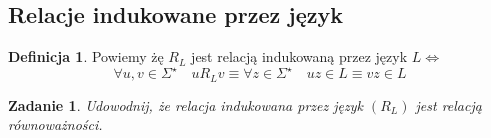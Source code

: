 \documentclass[12pt,a4paper]{article}
\newtheorem{zad}{Zadanie}
\theoremstyle{definition}
\newtheorem{df}{Definicja}
\theoremstyle{remark}
\begin{document}
\subsection{Relacje indukowane przez język}	
	
	\begin{df}
		Powiemy żę $R_L$ jest relacją indukowaną przez język 
		$L \Leftrightarrow$ $$ \forall u,v \in \Sigma^\star \quad uR_Lv \equiv \forall z\in \Sigma^\star \quad uz\in L \equiv vz\in L$$
	\end{df}	
	
	\begin{zad} 
		Udowodnij, że relacja indukowana przez język $(R_L)$ jest relacją równoważności.
	\end{zad}
	
\end{document}
